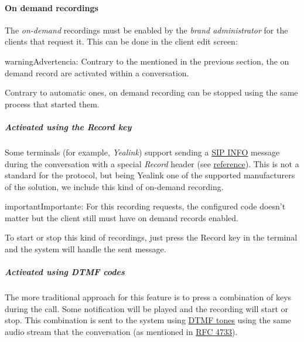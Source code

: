 \documentclass[letterpaper,10pt,spanish]{sphinxmanual}
\begin{document}
\paragraph{On demand recordings}
\label{administration_portal/client/vpbx/calls/call_recordings:on-demand-recordings}
The \emph{on-demand} recordings must be enabled by the \emph{brand administrator} for the
clients that request it. This can be done in the client edit screen:

\begin{notice}{warning}{Advertencia:}
Contrary to the {\hyperref[administration_portal/client/vpbx/services:services]{}} mentioned in the
previous section, the on demand record are activated within a conversation.
\end{notice}

Contrary to automatic ones, on demand recording can be stopped using the same
process that started them.


\subparagraph{Activated using the \emph{Record} key}
\label{administration_portal/client/vpbx/calls/call_recordings:activated-using-the-record-key}
Some terminals (for example, \emph{Yealink}) support sending a \href{https://tools.ietf.org/html/rfc6086}{SIP INFO} message during the conversation with a
special \emph{Record} header (see \href{http://www.yealink.com/Upload/document/UsingCallRecordingFeatureonYealinkPhones/UsingCallRecordingFeatureonYealinkSIPT2XPphonesRev\_610-20561729764.pdf}{reference}).
This is not a standard for the protocol, but being Yealink one of the supported
manufacturers of the solution, we include this kind of on-demand recording.

\begin{notice}{important}{Importante:}
For this recording requests, the configured code doesn't matter
but the client still must have on demand records enabled.
\end{notice}

To start or stop this kind of recordings, just press the Record key in the
terminal and the system will handle the sent message.


\subparagraph{Activated using \emph{DTMF} codes}
\label{administration_portal/client/vpbx/calls/call_recordings:activated-using-dtmf-codes}
The more traditional approach for this feature is to press a combination of
keys during the call. Some notification will be played and the recording will
start or stop. This combination is sent to the system using \href{https://es.wikipedia.org/wiki/Marcaci\%C3\%B3n\_por\_tonos}{DTMF tones} using the same audio
stream that the conversation (as mentioned in \href{https://tools.ietf.org/html/rfc4733}{RFC 4733}).
\end{document}

